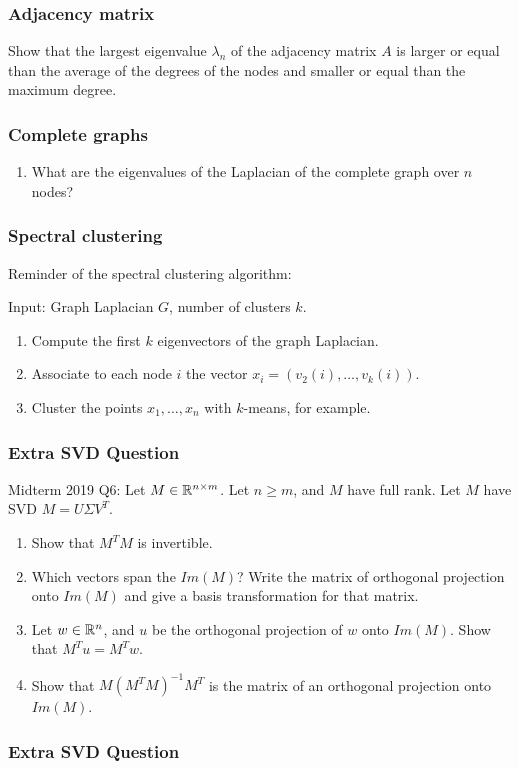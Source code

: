 \documentclass{beamer}
\begin{document}
\begin{frame}[t]
\frametitle{Adjacency matrix}
Show that the largest eigenvalue $\lambda_n$ of the adjacency matrix $A$ is larger or equal than the average of the degrees of the nodes and smaller or equal than the maximum degree. 
\pause
\end{frame}

\begin{frame}[t]
\frametitle{Complete graphs}
\begin{enumerate}
\item What are the eigenvalues of the Laplacian of the complete graph over $n$ nodes?
\end{enumerate}
\pause
\end{frame}

\begin{frame}[t]
\frametitle{Spectral clustering}
Reminder of the spectral clustering algorithm:

Input: Graph Laplacian $G$, number of clusters $k$.
\begin{enumerate}
\item Compute the first $k$ eigenvectors of the graph Laplacian.
\item Associate to each node $i$ the vector $x_i = (v_2(i), \dots, v_k(i))$.
\item Cluster the points $x_1, \dots, x_n$ with $k$-means, for example.
\end{enumerate}
\end{frame}

\begin{frame}[t]
\frametitle{Extra SVD Question}
Midterm 2019 Q6: Let $M\in \mathbb{R}^{n\times m}$. Let $n \geq m$, and $M$ have full rank. Let $M$ have SVD $M= U\Sigma V^T$.
\begin{enumerate}
\item Show that $M^TM$ is invertible.
\item Which vectors span the $Im(M)$? Write the matrix of orthogonal projection onto $Im(M)$ and give a basis transformation for that matrix.
\item Let $w\in \mathbb{R}^n$, and $u$ be the orthogonal projection of $w$ onto $Im(M)$. Show that $M^Tu = M^Tw$.
\item Show that $M(M^TM)^{-1} M^T$ is the matrix of an orthogonal projection onto $Im(M)$.
\end{enumerate}
\end{frame}

\begin{frame}[t]
\frametitle{Extra SVD Question}
\pause
\pause
\pause
\pause
\end{frame}

\begin{frame}[t]
\pause
\end{frame}
\end{document}
